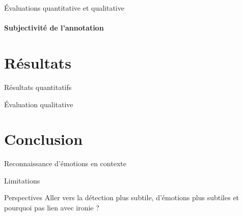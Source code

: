 \documentclass[11pt,aspectratio=169]{beamer}
\begin{document}
\begin{frame}{Évaluations quantitative et qualitative}
    \framesubtitle{Subjectivité de l'annotation}
    
\end{frame}

\section{Résultats}

\begin{frame}{Résultats quantitatifs}
    
\end{frame}

\begin{frame}{Évaluation qualitative}
    
\end{frame}

\section{Conclusion}

\begin{frame}{Reconnaissance d'émotions en contexte}
    
\end{frame}

\begin{frame}{Limitations}
    
\end{frame}

\begin{frame}{Perspectives}
    Aller vers la détection plus subtile, d'émotions plus subtiles et pourquoi pas lien avec ironie ?
\end{frame}
\end{document}
